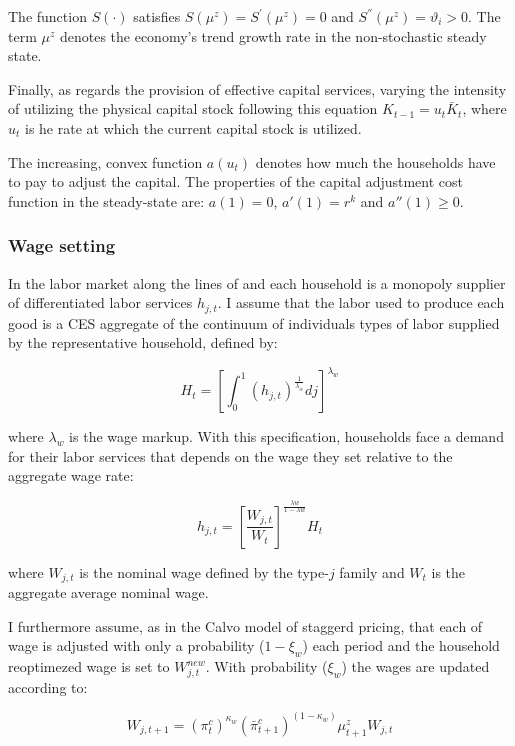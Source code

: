 \documentclass[12pt,oneside,a4paper]{article}
\begin{document}
The function $S(\cdot)$ satisfies $S(\mu^{z}) = S^{'}(\mu^{z}) = 0$ and $S^{''}(\mu^{z}) = \vartheta_{i} > 0$. The term $\mu^{z}$ denotes the economy’s trend growth rate in the non-stochastic
steady state.

Finally, as regards the provision of effective capital services, varying the intensity of utilizing the physical capital stock following this equation $K_{t-1} = u_t\bar{K}_t$, where $u_t$ is he rate at which the current capital stock is utilized.

The increasing, convex function $a(u_t)$ denotes how much the households have to pay to adjust the capital. The properties of the capital adjustment cost function in the steady-state are: $a(1) = 0$, $a'(1) = r^{k}$ and $a''(1) \geq 0$.
\subsubsection{Wage setting}
In the labor market along the lines of \citet{Erceg:2000} and \citet{Calvo:1983} each household is a monopoly supplier of differentiated labor services $h_{j,t}$. I assume that the labor used to produce each good is a CES aggregate of the continuum of individuals types of labor supplied by the representative household, defined by:

\begin{equation}
    H_{t}=\left[\int_{0}^{1}\left(h_{j, t}\right)^{\frac{1}{\lambda_{w}}} dj\right]^{\lambda_{w}}
\end{equation}

where $\lambda_w$ is the wage markup. With this specification, households face a demand for their labor services that depends on the wage they set relative to the aggregate wage rate:

\begin{equation}
    h_{j, t}=\left[\frac{W_{j, t}}{W_{t}}\right]^{\frac{\lambda w}{1-\lambda w}} H_{t}
\end{equation}

where $W_{j, t}$ is the nominal wage  defined by the type-$j$ family and $W_t$ is the aggregate average nominal wage. 

I furthermore assume, as in the Calvo model of staggerd pricing, that each of wage is adjusted with only a probability ($1 - \xi_w$) each period and the household reoptimezed wage is set to $W_{j,t}^{new}$. With probability ($\xi_w$) the wages are updated according to:

\begin{equation}
\label{Indexation_wage}
     W_{j, t+1}=\left(\pi_{t}^{c}\right)^{\kappa_{w}}\left(\bar{\pi}_{t+1}^{c}\right)^{\left(1-\kappa_{w}\right)} \mu_{t+1}^{z} W_{j, t}
\end{equation}
\end{document}
